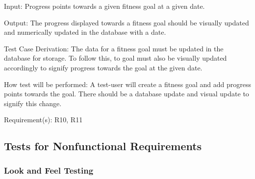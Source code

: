 \documentclass[12pt, titlepage]{article}
\begin{document}
\begin{enumerate}
		Input: Progress points towards a given fitness goal at a given date.
		
		Output: The progress displayed towards a fitness goal should be visually updated and numerically updated in the database with a date.
		
		Test Case Derivation: The data for a fitness goal must be updated in the database for storage. To follow this, to goal must also be visually updated accordingly to signify progress towards the goal at the given date.
		
		How test will be performed: A test-user will create a fitness goal and add progress points towards the goal. There should be a database update and visual update to signify this change.
		
		Requirement(s): R10, R11
		
		
	\end{enumerate}

	
	\subsection{Tests for Nonfunctional Requirements}
	
	
	
	
	\subsubsection{Look and Feel Testing}
	
\end{document}
